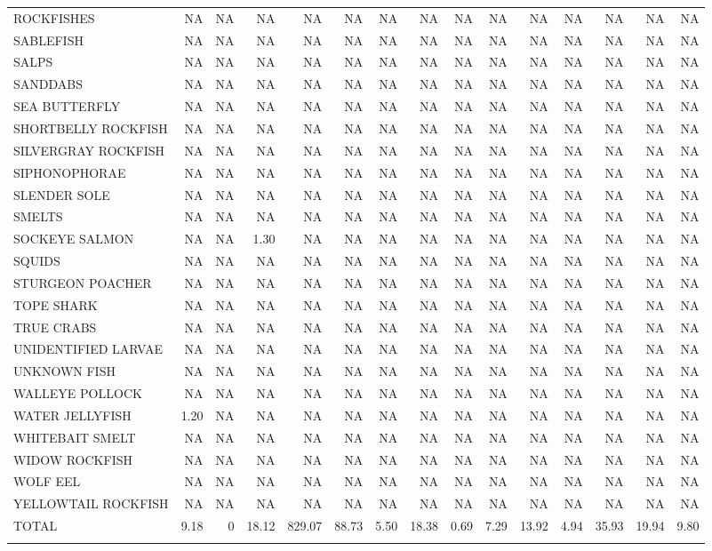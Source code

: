 \documentclass[12pt]{article}\usepackage[]{graphicx}\usepackage[]{color}
\begin{document}
\begin{landscape}
\begin{longtable}[t]{>{\raggedright\arraybackslash}p{3.6 cm}rrrrrrrrrrrrrr}
ROCKFISHES & NA & NA & NA & NA & NA & NA & NA & NA & NA & NA & NA & NA & NA & NA\\
SABLEFISH & NA & NA & NA & NA & NA & NA & NA & NA & NA & NA & NA & NA & NA & NA\\
SALPS & NA & NA & NA & NA & NA & NA & NA & NA & NA & NA & NA & NA & NA & NA\\
SANDDABS & NA & NA & NA & NA & NA & NA & NA & NA & NA & NA & NA & NA & NA & NA\\
SEA BUTTERFLY & NA & NA & NA & NA & NA & NA & NA & NA & NA & NA & NA & NA & NA & NA\\
SHORTBELLY ROCKFISH & NA & NA & NA & NA & NA & NA & NA & NA & NA & NA & NA & NA & NA & NA\\
SILVERGRAY ROCKFISH & NA & NA & NA & NA & NA & NA & NA & NA & NA & NA & NA & NA & NA & NA\\
SIPHONOPHORAE & NA & NA & NA & NA & NA & NA & NA & NA & NA & NA & NA & NA & NA & NA\\
SLENDER SOLE & NA & NA & NA & NA & NA & NA & NA & NA & NA & NA & NA & NA & NA & NA\\
SMELTS & NA & NA & NA & NA & NA & NA & NA & NA & NA & NA & NA & NA & NA & NA\\
SOCKEYE SALMON & NA & NA & 1.30 & NA & NA & NA & NA & NA & NA & NA & NA & NA & NA & NA\\
SQUIDS & NA & NA & NA & NA & NA & NA & NA & NA & NA & NA & NA & NA & NA & NA\\
STURGEON POACHER & NA & NA & NA & NA & NA & NA & NA & NA & NA & NA & NA & NA & NA & NA\\
TOPE SHARK & NA & NA & NA & NA & NA & NA & NA & NA & NA & NA & NA & NA & NA & NA\\
TRUE CRABS & NA & NA & NA & NA & NA & NA & NA & NA & NA & NA & NA & NA & NA & NA\\
UNIDENTIFIED LARVAE & NA & NA & NA & NA & NA & NA & NA & NA & NA & NA & NA & NA & NA & NA\\
UNKNOWN FISH & NA & NA & NA & NA & NA & NA & NA & NA & NA & NA & NA & NA & NA & NA\\
WALLEYE POLLOCK & NA & NA & NA & NA & NA & NA & NA & NA & NA & NA & NA & NA & NA & NA\\
WATER JELLYFISH & 1.20 & NA & NA & NA & NA & NA & NA & NA & NA & NA & NA & NA & NA & NA\\
WHITEBAIT SMELT & NA & NA & NA & NA & NA & NA & NA & NA & NA & NA & NA & NA & NA & NA\\
WIDOW ROCKFISH & NA & NA & NA & NA & NA & NA & NA & NA & NA & NA & NA & NA & NA & NA\\
WOLF EEL & NA & NA & NA & NA & NA & NA & NA & NA & NA & NA & NA & NA & NA & NA\\
YELLOWTAIL ROCKFISH & NA & NA & NA & NA & NA & NA & NA & NA & NA & NA & NA & NA & NA & NA\\
TOTAL & 9.18 & 0 & 18.12 & 829.07 & 88.73 & 5.50 & 18.38 & 0.69 & 7.29 & 13.92 & 4.94 & 35.93 & 19.94 & 9.80\\*
\end{longtable}
\end{landscape}
\endgroup{}
\end{document}

